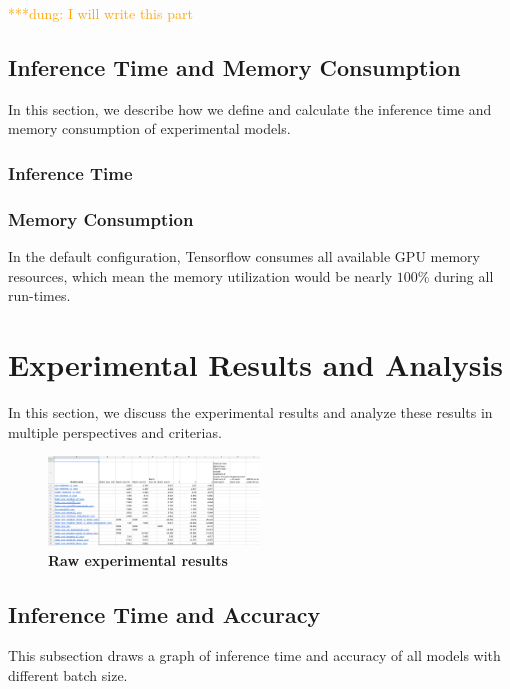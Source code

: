 \documentclass[conference]{IEEEtran}
\newcommand{\dungnote}[1]{ {\textcolor{orange} { ***dung: #1 }}}
\newcommand{\dungnote}[1]{}
\begin{document}
\dungnote{I will write this part}

\subsection{Inference Time and Memory Consumption}
In this section, we describe how we define and calculate the inference time and memory consumption of experimental models.



\subsubsection{Inference Time}

\subsubsection{Memory Consumption}
In the default configuration, Tensorflow consumes all available GPU memory resources, which mean the memory utilization would be nearly $100\%$ during all run-times.


\section{Experimental Results and Analysis}


In this section, we discuss the experimental results and analyze these results in multiple perspectives and criterias.

\begin{figure}[htpb]
	  \centering
	  \includegraphics[width=0.5\textwidth]{experimental_results}
	  \caption{\textbf{Raw experimental results}}
	  \label{fig:experimental_results}
\end{figure}

\subsection{Inference Time and Accuracy}
This subsection draws a graph of inference time and accuracy of all models with different batch size.
\end{document}
